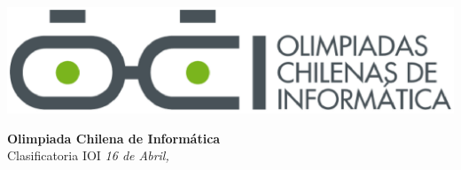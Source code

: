 \documentclass[12pt]{oci}
\begin{document}
\begin{titlingpage}
  \begin{center}
  \includegraphics[scale=0.6]{logo.eps}

  \vskip 70pt
  \Large{\bf Olimpiada Chilena de Inform\'atica\\ \the\year}
  \vskip 10pt
  \large{Clasificatoria IOI}
  \vskip 10pt
  \normalsize{\it 16 de Abril, \the\year}


  \vskip 95pt

  \end{center}

\end{titlingpage}

\cleardoublepage






\end{document}
